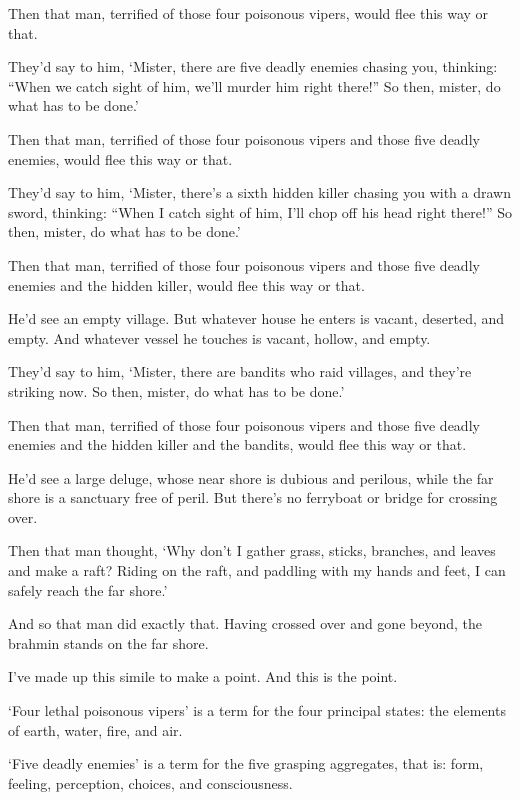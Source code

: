 \documentclass[12pt,openany]{book}%
\begin{document}
Then that man, terrified of those four poisonous vipers, would flee this way or that. 

They’d say to him, ‘Mister, there are five deadly enemies chasing you, thinking: “When we catch sight of him, we’ll murder him right there!” So then, mister, do what has to be done.’ 

Then that man, terrified of those four poisonous vipers and those five deadly enemies, would flee this way or that. 

They’d say to him, ‘Mister, there’s a sixth hidden killer chasing you with a drawn sword, thinking: “When I catch sight of him, I’ll chop off his head right there!” So then, mister, do what has to be done.’ 

Then that man, terrified of those four poisonous vipers and those five deadly enemies and the hidden killer, would flee this way or that. 

He’d see an empty village. But whatever house he enters is vacant, deserted, and empty. And whatever vessel he touches is vacant, hollow, and empty. 

They’d say to him, ‘Mister, there are bandits who raid villages, and they’re striking now. So then, mister, do what has to be done.’ 

Then that man, terrified of those four poisonous vipers and those five deadly enemies and the hidden killer and the bandits, would flee this way or that. 

He’d see a large deluge, whose near shore is dubious and perilous, while the far shore is a sanctuary free of peril. But there’s no ferryboat or bridge for crossing over. 

Then that man thought, ‘Why don’t I gather grass, sticks, branches, and leaves and make a raft? Riding on the raft, and paddling with my hands and feet, I can safely reach the far shore.’ 

And so that man did exactly that. Having crossed over and gone beyond, the brahmin stands on the far shore. 

I’ve made up this simile to make a point. And this is the point. 

‘Four lethal poisonous vipers’ is a term for the four principal states: the elements of earth, water, fire, and air. 

‘Five deadly enemies’ is a term for the five grasping aggregates, that is: form, feeling, perception, choices, and consciousness. 
\end{document}
